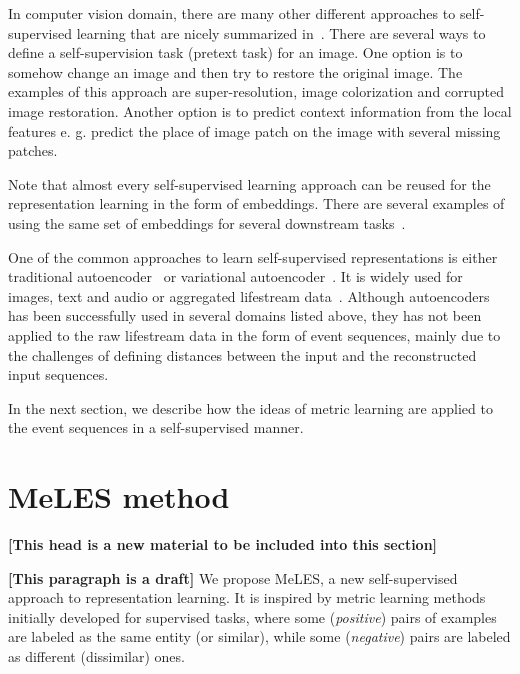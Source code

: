 \documentclass{article}
\newcommand{\nt}[1]{{\bf [#1]}}
\begin{document}
In computer vision domain, there are many other different approaches to self-supervised learning that are nicely summarized in~\cite{Jing2020SelfsupervisedVF}. There are several ways to define a self-supervision task (pretext task) for an image. One option is to somehow change an image and then try to restore the original image. The examples of this approach are super-resolution, image colorization and corrupted image restoration. Another option is to predict context information from the local features e. g. predict the place of image patch on the image with several missing patches.

Note that almost every self-supervised learning approach can be reused for the representation learning in the form of embeddings. There are several examples of using the same set of embeddings for several downstream tasks~\cite{Song2017LearningUE, Zhai2019LearningAU}.

One of the common approaches to learn self-supervised representations is either traditional autoencoder~\cite{Rumelhart1986LearningIR} or variational autoencoder~\cite{Kingma2014AutoEncodingVB}. It is widely used for images, text and audio or aggregated lifestream data~\cite{Mancisidor2019LearningLR}. Although autoencoders has been successfully used in several domains listed above, they has not been applied to the raw lifestream data in the form of event sequences, mainly due to the challenges of defining distances between the input and the reconstructed input sequences.

In the next section, we describe how the ideas of metric learning are applied to the event sequences in a self-supervised manner.

\section{MeLES method} \label{sec-method}

\nt{This head is a new material to be included into this section}

\nt{This paragraph is a draft}
We propose MeLES, a new self-supervised approach to representation learning. It is inspired by metric learning methods initially developed for supervised tasks, where some (\textit{positive}) pairs of examples are labeled as the same entity (or similar), while some (\textit{negative}) pairs are labeled as different (dissimilar) ones.
\end{document}
